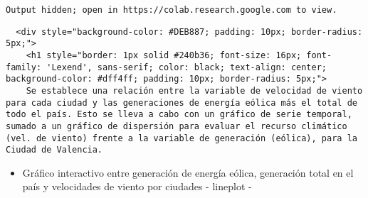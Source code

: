\documentclass[11pt]{article}
\providecommand{\tightlist}{%
      \setlength{\itemsep}{0pt}\setlength{\parskip}{0pt}}
\begin{document}
    
    \begin{Verbatim}[commandchars=\\\{\}]
Output hidden; open in https://colab.research.google.com to view.
    \end{Verbatim}

    
    \begin{verbatim}
  <div style="background-color: #DEB887; padding: 10px; border-radius: 5px;">
    <h1 style="border: 1px solid #240b36; font-size: 16px; font-family: 'Lexend', sans-serif; color: black; text-align: center; background-color: #dff4ff; padding: 10px; border-radius: 5px;">
    Se establece una relación entre la variable de velocidad de viento para cada ciudad y las generaciones de energía eólica más el total de todo el país. Esto se lleva a cabo con un gráfico de serie temporal, sumado a un gráfico de dispersión para evaluar el recurso climático (vel. de viento) frente a la variable de generación (eólica), para la Ciudad de Valencia.
\end{verbatim}

    \begin{itemize}
\tightlist
\item
  Gráfico interactivo entre generación de energía eólica, generación
  total en el país y velocidades de viento por ciudades - lineplot -
\end{itemize}
\end{document}
